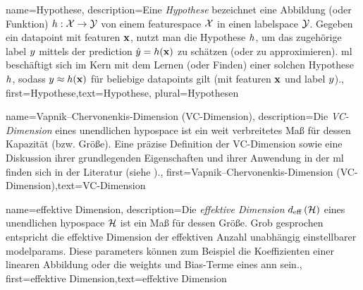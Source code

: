 {{{{{
{name={Hypothese},
	description={Eine \emph{Hypothese} bezeichnet eine Abbildung (oder Funktion) 
		$h: \mathcal{X} \rightarrow \mathcal{Y}$ von einem \gls{featurespace} $\mathcal{X}$ 
		in einen \gls{labelspace} $\mathcal{Y}$. 
		Gegeben ein \gls{datapoint} mit \gls{feature}n ${\bf x}$, 
		nutzt man die Hypothese $h$, um das zugehörige \gls{label} $y$ 
		mittels der \gls{prediction} $\hat{y} = h({\bf x})$ zu schätzen (oder zu approximieren). 
		\gls{ml} beschäftigt sich im Kern mit dem Lernen (oder Finden) einer solchen Hypothese $h$, 
		sodass $y \approx h({\bf x})$ für beliebige \glspl{datapoint} gilt 
		(mit \gls{feature}n ${\bf x}$ und \gls{label} $y$).},
	first={Hypothese},text={Hypothese}, plural={Hypothesen}  
}


{name={Vapnik–Chervonenkis-Dimension (VC-Dimension)},
	description={Die \emph{VC-Dimension} eines unendlichen \gls{hypospace} ist ein weit verbreitetes Maß für dessen Kapazität (bzw. Größe). 
		Eine präzise Definition der VC-Dimension sowie eine Diskussion ihrer grundlegenden Eigenschaften und ihrer Anwendung in der \gls{ml} finden sich in der Literatur 
		(siehe \cite{ShalevMLBook}).},
	first={Vapnik–Chervonenkis-Dimension (VC-Dimension)},text={VC-Dimension}  
}

{name={effektive Dimension},
	description={Die \emph{effektive Dimension} $d_{\rm eff} \left( \mathcal{H} \right)$ eines unendlichen \gls{hypospace} $\mathcal{H}$ 
		ist ein Maß für dessen Größe. Grob gesprochen entspricht die effektive Dimension 
		der effektiven Anzahl unabhängig einstellbarer \glspl{modelparam}. 
		Diese \gls{parameters} können zum Beispiel die Koeffizienten einer linearen Abbildung 
		oder die \gls{weights} und Bias-Terme eines \gls{ann} sein.},
	first={effektive Dimension},text={effektive Dimension}  
}



}}}}}
